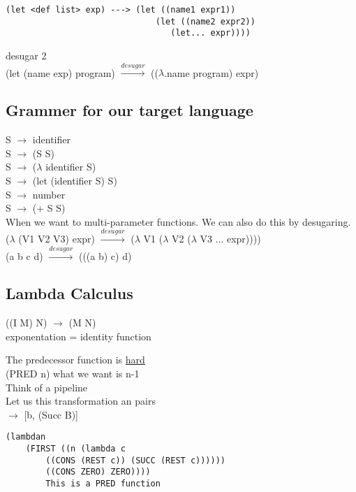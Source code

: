 \documentclass{article}
\begin{document}
\begin{flushleft}
\begin{flushleft}
\begin{verbatim}
(let <def list> exp) ---> (let ((name1 expr1))
                              (let ((name2 expr2)) 
                                 (let... expr))))
\end{verbatim}
desugar 2\\
(let (name exp) program) $\xrightarrow{desugar}$ (($\lambda$.name program) expr)
\end{flushleft}

\subsection*{Grammer for our target language}
\begin{flushleft}
S $\rightarrow$ identifier\\
S $\rightarrow$ (S S)\\
S $\rightarrow$ ($\lambda$ identifier S)\\
S $\rightarrow$ (let (identifier S) S)\\
S $\rightarrow$ number\\
S $\rightarrow$ (+ S S)\\

\doublespacing
When we want to multi-parameter functions. We can also do this by desugaring. \\

\doublespacing
($\lambda$ (V1 V2 V3) expr) $\xrightarrow{desugar}$ ($\lambda$ V1 ($\lambda$ V2 ($\lambda$ V3 ... expr))))\\

\doublespacing
(a b c d) $\xrightarrow{desugar}$ (((a b) c) d)
\end{flushleft}


\subsection*{Lambda Calculus}
\begin{flushleft}
((I M) N) $\rightarrow$ (M N)\\
\doublespacing
exponentation = identity function

\doublespacing
The predecessor function is \underline{hard}\\
(PRED n) what we want is n-1\\
Think of a pipeline\\
Let us this transformation an pairs\\
\center
[a b] $\rightarrow$ [b, (Succ B)]
\begin{verbatim}
(lambdan
    (FIRST ((n (lambda c
        ((CONS (REST c)) (SUCC (REST c))))))
        ((CONS ZERO) ZERO))))
        This is a PRED function
\end{verbatim}
\end{flushleft}


\end{flushleft}
\end{document}
